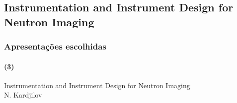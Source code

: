 \documentclass[svgnames,smaller,table]{beamer}
\begin{document}
\begin{frame}
    
\end{frame}

\begin{frame}
  
\end{frame}

\begin{frame}
  
\end{frame}

\begin{frame}
  
\end{frame}

\begin{frame}
  
\end{frame}

\begin{frame}
  
\end{frame}

\begin{frame}
  
\end{frame}

\subsection{Instrumentation and Instrument Design for Neutron Imaging}
\begin{frame}
  \frametitle{Apresentações escolhidas}
  \framesubtitle{(3)}
  \begin{center}
    Instrumentation and Instrument Design for Neutron Imaging\\
    \vspace{2.0cm}
    N. Kardjilov
  \end{center}
\end{frame}
\end{document}
